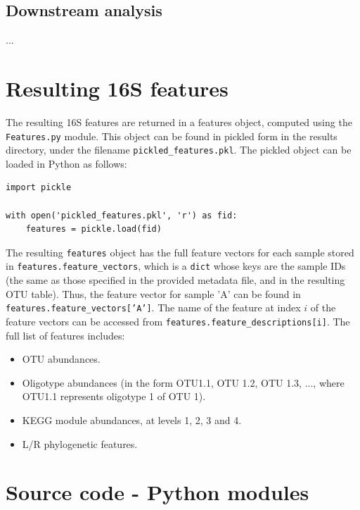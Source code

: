 \documentclass[11pt, oneside]{article}   	%
\begin{document}
\subsection{Downstream analysis}
...

\section{Resulting 16S features}
The resulting 16S features are returned in a features object, computed using the {\tt Features.py} module.  This object can be found in pickled form in the results directory, under the filename {\tt pickled\_features.pkl}.  The pickled object can be loaded in Python as follows:
\begin{verbatim}
import pickle

with open('pickled_features.pkl', 'r') as fid:
    features = pickle.load(fid)
\end{verbatim}
The resulting {\tt features} object has the full feature vectors for each sample stored in {\tt features.feature\_vectors}, which is a {\tt dict} whose keys are the sample IDs (the same as those specified in the provided metadata file, and in the resulting OTU table).  Thus, the feature vector for sample 'A' can be found in {\tt features.feature\_vectors['A']}.  The name of the feature at index $i$ of the feature vectors can be accessed from {\tt features.feature\_descriptions[i]}.  The full list of features includes:

\begin{itemize}
	\item OTU abundances.
	\item Oligotype abundances (in the form OTU1.1, OTU 1.2, OTU 1.3, ..., where OTU1.1 represents oligotype 1 of OTU 1).
	\item KEGG module abundances, at levels 1, 2, 3 and 4.
	\item L/R phylogenetic features.
\end{itemize}

\section{Source code - Python modules}
\end{document}

